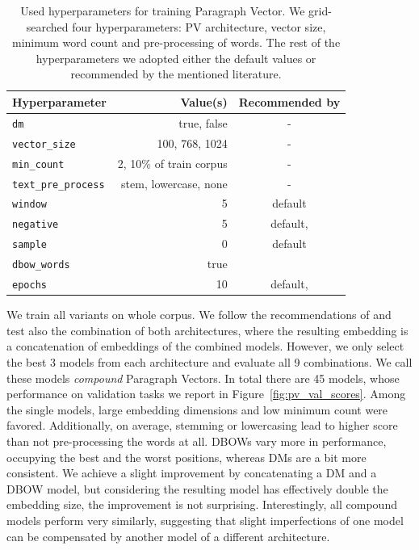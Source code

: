 \begin{table}
  \footnotesize
  \centering
  \begin{tabular}{lrc}
    \toprule
    Hyperparameter & Value(s) & Recommended by \\
    \midrule
    \texttt{dm} & true, false & - \\
    \texttt{vector\_size} & 100, 768, 1024 & - \\
    \texttt{min\_count} & 2, 10\% of train corpus & - \\
    \texttt{text\_pre\_process} & stem, lowercase, none & - \\
    \texttt{window} & 5 & default \\
    \texttt{negative} & 5 & default, \cite{lau2016empirical} \\
    \texttt{sample} & 0 & default \\
    \texttt{dbow\_words} & true & \cite{lau2016empirical} \\
    \texttt{epochs} & 10 & default, \cite{dai2015document} \\
    \bottomrule
  \end{tabular}

  \caption{Used hyperparameters for training Paragraph Vector. We grid-searched
  four hyperparameters: PV architecture, vector size, minimum word count and
  pre-processing of words. The rest of the hyperparameters we adopted either the
  default values or recommended by the mentioned literature.}

  \label{table:pv_hyperparams}

\end{table}

We train all variants on whole  corpus. We follow the
recommendations of \cite{le2014distributed} and test also the combination of
both architectures, where the resulting embedding is a concatenation of
embeddings of the combined models. However, we only select the best 3 models
from each architecture and evaluate all 9 combinations. We call these models
\emph{compound} Paragraph Vectors. In total there are 45 models, whose
performance on validation tasks we report in Figure~\ref{fig:pv_val_scores}.
Among the single models, large embedding dimensions and low minimum count were
favored. Additionally, on average, stemming or lowercasing lead to higher score
than not pre-processing the words at all. DBOWs vary more in performance,
occupying the best and the worst positions, whereas DMs are a bit more
consistent. We achieve a slight improvement by concatenating a DM and a DBOW
model, but considering the resulting model has effectively double the embedding
size, the improvement is not surprising. Interestingly, all compound models
perform very similarly, suggesting that slight imperfections of one model can
be compensated by another model of a different architecture.

